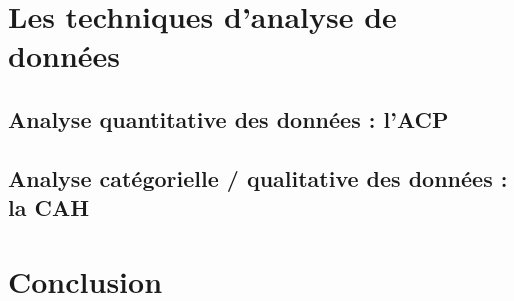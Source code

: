 \documentclass[11pt]{scrartcl}
\begin{document}
    \section{Les techniques d'analyse de données}

    \subsection{Analyse quantitative des données : l'ACP}
    \subsection{Analyse catégorielle / qualitative des données : la CAH}



    \section{Conclusion}
\end{document}
